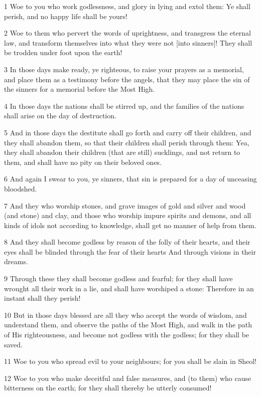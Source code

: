 \par 1 Woe to you who work godlessness, and glory in lying and extol them: Ye shall perish, and no happy life shall be yours!
\par 2 Woe to them who pervert the words of uprightness, and transgress the eternal law, and transform themselves into what they were not [into sinners]! They shall be trodden under foot upon the earth!
\par 3 In those days make ready, ye righteous, to raise your prayers as a memorial, and place them as a testimony before the angels, that they may place the sin of the sinners for a memorial before the Most High.
\par 4 In those days the nations shall be stirred up, and the families of the nations shall arise on the day of destruction.
\par 5 And in those days the destitute shall go forth and carry off their children, and they shall abandon them, so that their children shall perish through them: Yea, they shall abandon their children (that are still) sucklings, and not return to them, and shall have no pity on their beloved ones.
\par 6 And again I swear to you, ye sinners, that sin is prepared for a day of unceasing bloodshed.
\par 7 And they who worship stones, and grave images of gold and silver and wood (and stone) and clay, and those who worship impure spirits and demons, and all kinds of idols not according to knowledge, shall get no manner of help from them.
\par 8 And they shall become godless by reason of the folly of their hearts, and their eyes shall be blinded through the fear of their hearts And through visions in their dreams.
\par 9 Through these they shall become godless and fearful; for they shall have wrought all their work in a lie, and shall have worshiped a stone: Therefore in an instant shall they perish!
\par 10 But in those days blessed are all they who accept the words of wisdom, and understand them, and observe the paths of the Most High, and walk in the path of His righteousness, and become not godless with the godless; for they shall be saved.
\par 11 Woe to you who spread evil to your neighbours; for you shall be slain in Sheol!
\par 12 Woe to you who make deceitful and false measures, and (to them) who cause bitterness on the earth; for they shall thereby be utterly consumed!
